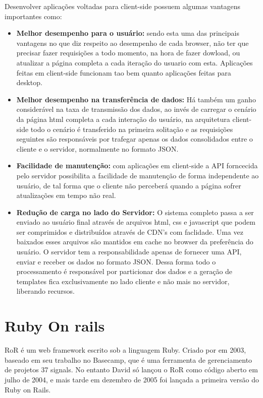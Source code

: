 Desenvolver aplicações voltadas para client-side possuem algumas vantagens importantes como:
\begin{itemize}
    \item{ \textbf{Melhor desempenho para o usuário:}
      sendo esta uma das principais vantagens no que diz respeito ao desempenho de cada browser, não ter que precisar 
      fazer requisições a todo momento, na hora de fazer dowload, ou atualizar a página completa a cada iteração do 
      usuario com esta. Aplicações feitas em client-side funcionam tao bem quanto aplicações feitas para desktop.
    }
    \item{ \textbf{Melhor desempenho na transferência de dados:}
      Há também um ganho considerável na taxa de transmissão dos dados, ao invés de carregar o cenário da página html completa
      a cada interação do usuário, na arquitetura client-side todo o cenário é transferido na primeira solitação e as requisições 
      seguintes são responsáveis por trafegar apenas os dados consolidados entre o cliente e o servidor, normalmente no formato JSON. 
    }
    
    \item{ \textbf{Facilidade de manutenção:}
      com aplicações em client-side a API forncecida pelo servidor possibilita a facilidade de manutenção de forma independente ao usuário,
      de tal forma que o cliente não perceberá quando a página sofrer atualizações em tempo não real.
    }
    
    \item{ \textbf{Redução de carga no lado do Servidor:}
      O sistema completo passa a ser enviado ao usuário final através de arquivos html, css e javascript que podem ser comprimidos 
      e distribuídos através de CDN's com faclidade. Uma vez baixados esses arquivos são mantidos em cache no browser da preferência do usuário. 
      O servidor tem a responsabilidade apenas de fornecer uma API, enviar e receber os dados no formato JSON. Dessa forma todo o processamento 
      é responsável por particionar dos dados e  a geração de templates fica exclusivamente no lado cliente e não mais no servidor, liberando recursos. 
    }
\end{itemize}

\section{Ruby On rails}

RoR é um web framework escrito sob a linguagem Ruby. Criado por \cite{DAVIDHANSSON} em 2003, baseado em seu trabalho no Basecamp, que é 
uma ferramenta de gerenciamento de projetos 37 signals. No entanto David só lançou o RoR como código aberto em julho de 2004, e mais tarde em dezembro de 
2005 foi lançada a primeira versão do Ruby on Rails.

